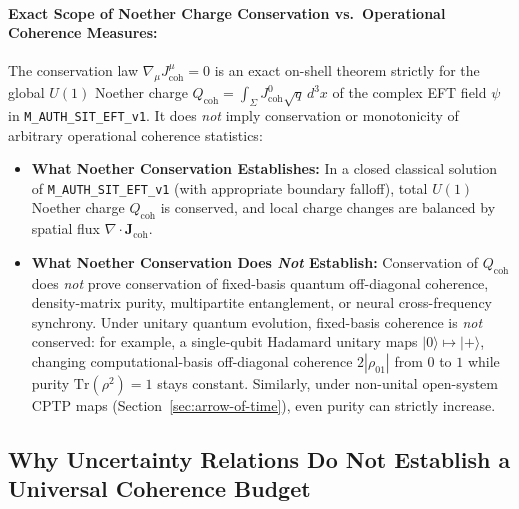\paragraph{Exact Scope of Noether Charge Conservation vs.\ Operational Coherence Measures:}
The conservation law $\nabla_\mu J^\mu_{\mathrm{coh}} = 0$ is an exact on-shell theorem strictly for the global $U(1)$ Noether charge $Q_{\mathrm{coh}} = \int_\Sigma J^0_{\mathrm{coh}}\sqrt{q}\,d^3x$ of the complex EFT field $\psi$ in \texttt{M\_AUTH\_SIT\_EFT\_v1}. It does \emph{not} imply conservation or monotonicity of arbitrary operational coherence statistics:
\begin{itemize}
    \item \textbf{What Noether Conservation Establishes:} In a closed classical solution of \texttt{M\_AUTH\_SIT\_EFT\_v1} (with appropriate boundary falloff), total $U(1)$ Noether charge $Q_{\mathrm{coh}}$ is conserved, and local charge changes are balanced by spatial flux $\nabla\cdot\mathbf{J}_{\mathrm{coh}}$.
    \item \textbf{What Noether Conservation Does \emph{Not} Establish:} Conservation of $Q_{\mathrm{coh}}$ does \emph{not} prove conservation of fixed-basis quantum off-diagonal coherence, density-matrix purity, multipartite entanglement, or neural cross-frequency synchrony. Under unitary quantum evolution, fixed-basis coherence is \emph{not} conserved: for example, a single-qubit Hadamard unitary maps $|0\rangle \mapsto |+\rangle$, changing computational-basis off-diagonal coherence $2|\rho_{01}|$ from $0$ to $1$ while purity $\mathrm{Tr}(\rho^2) = 1$ stays constant. Similarly, under non-unital open-system CPTP maps (Section~\ref{sec:arrow-of-time}), even purity can strictly increase.
\end{itemize}

\subsection{Why Uncertainty Relations Do Not Establish a Universal Coherence Budget}
\label{subsec:uncertainty-vs-coherence}

